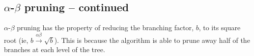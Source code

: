 
\subsection{$\alpha$-$\beta$ pruning -- continued}
\label{sub:alpha_beta_pruning_continued}

$\alpha$-$\beta$ pruning has the property of reducing the branching factor, $b$, to its square root (ie, $b \stackrel{\alpha \beta}{\rightarrow} \sqrt{b}$). This is because the algorithm is able to prune away half of the branches at each level of the tree.




\newpage